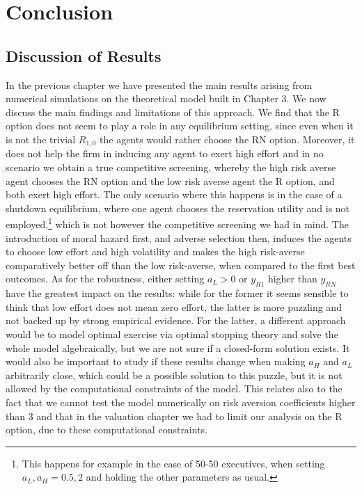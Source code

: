 \section{Conclusion}

\subsection{Discussion of Results}
In the previous chapter we have presented the main results arising from numerical simulations on the theoretical model built in Chapter 3. We now discuss the main findings and limitations of this approach. 
We find that the R option does not seem to play a role in any equilibrium setting, since even when it is not the trivial $R_{1,0}$ the agents would rather choose the RN option. Moreover, it does not help the firm in inducing any agent to exert high effort and in no scenario we obtain a true competitive screening, whereby the high risk averse agent chooses the RN option and the low risk averse agent the R option, and both exert high effort. The only scenario where this happens is in the case of a shutdown equilibrium, where one agent chooses the reservation utility and is not employed,\footnote{This happens for example in the case of 50-50 executives, when setting $a_L, a_H = 0.5,2$ and holding the other parameters as usual.} which is not however the competitive screening we had in mind.
The introduction of moral hazard first, and adverse selection then, induces the agents to choose low effort and high volatility and makes the high risk-averse comparatively better off than the low risk-averse, when compared to the first best outcomes. As for the robustness, either setting $a_L > 0$ or $y_{R1}$ higher than $y_{RN}$ have the greatest impact on the results: while for the former it seems sensible to think that low effort does not mean zero effort, the latter is more puzzling and not backed up by strong empirical evidence. For the latter, a different approach would be to model optimal exercise via optimal stopping theory and solve the whole model algebraically, but we are not sure if a closed-form solution exists. It would also be important to study if these results change when making $a_H$ and $a_L$ arbitrarily close, which could be a possible solution to this puzzle, but it is not allowed by the computational constraints of the model. This relates also to the fact that we cannot test the model numerically on risk aversion coefficients higher than $3$ and that in the valuation chapter we had to limit our analysis on the R option, due to these computational constraints.
